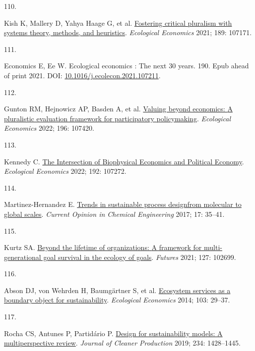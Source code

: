 \documentclass[
  11pt,
  a4paperpaper,
  onecolumn]{article}
\newlength{\cslhangindent}
\newlength{\csllabelwidth}
\newlength{\cslentryspacingunit} %
\newenvironment{CSLReferences}[2] %
 {%
  \setlength{\parindent}{0pt}
  \ifodd #1
  \let\oldpar\par
  \def\par{\hangindent=\cslhangindent\oldpar}
  \fi
  \setlength{\parskip}{#2\cslentryspacingunit}
 }%
 {}
\newcommand{\CSLLeftMargin}[1]{\parbox[t]{\csllabelwidth}{#1}}
\newcommand{\CSLRightInline}[1]{\parbox[t]{\linewidth - \csllabelwidth}{#1}\break}
\begin{document}
\begin{CSLReferences}{0}{0}
\leavevmode{}%
\CSLLeftMargin{110. }%
\CSLRightInline{Kish K, Mallery D, Yahya Haage G, et al.
\href{https://doi.org/10.1016/j.ecolecon.2021.107171}{Fostering critical
pluralism with systems theory, methods, and heuristics}.
\emph{Ecological Economics} 2021; 189: 107171.}

\leavevmode{}%
\CSLLeftMargin{111. }%
\CSLRightInline{Economics E, Ee W. Ecological economics : {The} next 30
years. 190. Epub ahead of print 2021. DOI:
\href{https://doi.org/10.1016/j.ecolecon.2021.107211}{10.1016/j.ecolecon.2021.107211}.}

\leavevmode{}%
\CSLLeftMargin{112. }%
\CSLRightInline{Gunton RM, Hejnowicz AP, Basden A, et al.
\href{https://doi.org/10.1016/j.ecolecon.2022.107420}{Valuing beyond
economics: {A} pluralistic evaluation framework for participatory
policymaking}. \emph{Ecological Economics} 2022; 196: 107420.}

\leavevmode{}%
\CSLLeftMargin{113. }%
\CSLRightInline{Kennedy C.
\href{https://doi.org/10.1016/J.ECOLECON.2021.107272}{The {Intersection}
of {Biophysical Economics} and {Political Economy}}. \emph{Ecological
Economics} 2022; 192: 107272.}

\leavevmode{}%
\CSLLeftMargin{114. }%
\CSLRightInline{Martinez-Hernandez E.
\href{https://doi.org/10.1016/j.coche.2017.05.005}{Trends in sustainable
process design\textemdash from molecular to global scales}.
\emph{Current Opinion in Chemical Engineering} 2017; 17: 35--41.}

\leavevmode{}%
\CSLLeftMargin{115. }%
\CSLRightInline{Kurtz SA.
\href{https://doi.org/10.1016/j.futures.2021.102699}{Beyond the lifetime
of organizations: {A} framework for multi-generational goal survival in
the ecology of goals}. \emph{Futures} 2021; 127: 102699.}

\leavevmode{}%
\CSLLeftMargin{116. }%
\CSLRightInline{Abson DJ, von Wehrden H, Baumgärtner S, et al.
\href{https://doi.org/10.1016/j.ecolecon.2014.04.012}{Ecosystem services
as a boundary object for sustainability}. \emph{Ecological Economics}
2014; 103: 29--37.}

\leavevmode{}%
\CSLLeftMargin{117. }%
\CSLRightInline{Rocha CS, Antunes P, Partidário P.
\href{https://doi.org/10.1016/j.jclepro.2019.06.108}{Design for
sustainability models: {A} multiperspective review}. \emph{Journal of
Cleaner Production} 2019; 234: 1428--1445.}


\end{CSLReferences}
\end{document}
